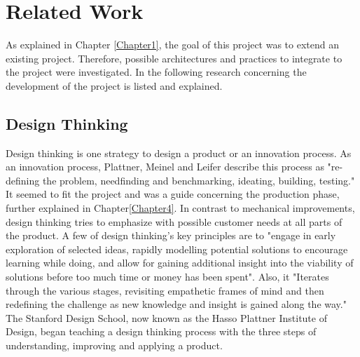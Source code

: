 
\chapter{Related Work} %

\label{Chapter2} %
As explained in Chapter \ref{Chapter1}, the goal of this project was to extend an existing project.
Therefore, possible architectures and practices to integrate to the project were investigated.
In the following research concerning the development of the project is listed and explained.
\section{Design Thinking}
Design thinking is one strategy to design a product or an innovation process.
As an innovation process, Plattner, Meinel and Leifer describe this process as 
"re-defining the problem, needfinding and benchmarking, ideating, building, testing." \parencite{designThinkingBook}
It seemed to fit the project and was a guide concerning the production phase, further explained in Chapter\ref{Chapter4}.
In contrast to mechanical improvements, design thinking tries to emphasize with possible customer needs at all parts of the product.
A few of design thinking's key principles are to 
"engage in early exploration of selected ideas, rapidly modelling potential solutions to encourage learning 
while doing, and allow for gaining additional insight into the viability of 
solutions before too much time or money has been spent". Also, it 
"Iterates through the various stages, revisiting empathetic frames of mind and then redefining the challenge as new knowledge and insight is gained along the way." 
\parencite{designThinking}
The Stanford Design School, now known as the Hasso Plattner Institute of Design, began teaching a design thinking process 
with the three steps of understanding, improving and applying a product. 

